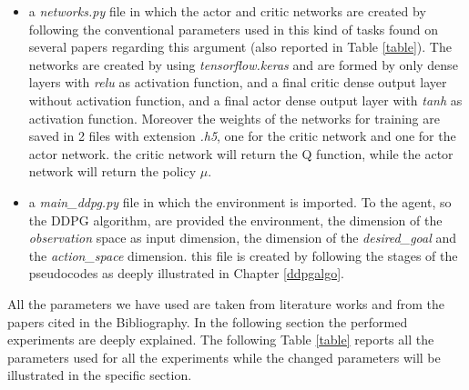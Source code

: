 \documentclass[a4paper]{report}
\begin{document}
\begin{itemize}
\item a \textit{networks.py} file in which the actor and critic networks are created by following the conventional parameters used in this kind of tasks found on several papers regarding this argument (also reported in Table \ref{table}). The networks are created by using \textit{tensorflow.keras} and are formed by only dense layers with \textit{relu} as activation function, and a final critic dense output layer without activation function, and a final actor dense output layer with \textit{tanh} as activation function. Moreover the weights of the networks for training are saved in 2 files with extension \textit{.h5}, one for the critic network and one for the actor network. the critic network will return the Q function, while the actor network will return the policy $\mu$.



\item a \textit{main\_ddpg.py} file in which the environment is imported. To the agent, so the DDPG algorithm, are provided the environment, the dimension of the \textit{observation} space as input dimension, the dimension of the \textit{desired\_goal} and the \textit{action\_space} dimension. this file is created by following the stages of the pseudocodes as deeply illustrated in Chapter \ref{ddpgalgo}.

\end{itemize}

All the parameters we have used are taken from literature works and from the papers cited in the Bibliography. In the following section the performed experiments are deeply explained. The following Table \ref{table} reports all the parameters used for all the experiments while the changed parameters will be illustrated in the specific section.
\\
\end{document}
